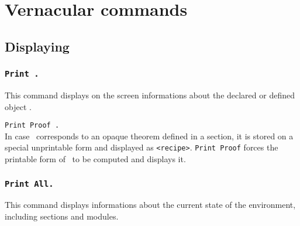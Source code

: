\chapter{Vernacular commands}
\label{Vernacular-commands}
\label{Other-commands}

\section{Displaying}

\subsection{\tt Print {\ident}.}
This command displays on the screen informations about the declared or
defined object {\ident}.

\begin{ErrMsgs}
\item {\ident} 
\end{ErrMsgs}

\begin{Variants}
\item {\tt Print Proof {\ident}.}\\
In case \ident\ corresponds to an opaque theorem defined in a section,
it is stored on a special unprintable form and displayed as 
{\tt <recipe>}. {\tt Print Proof} forces the printable form of \ident\
to be computed and displays it.
\end{Variants}

\subsection{\tt Print All.}
This command displays informations about the current state of the
environment, including sections and modules.


